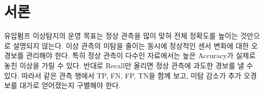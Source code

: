 \documentclass{article}
\begin{document}
\makeatletter\gdef{}\makeatother
{}
\begin{abstract}
기존 PCA 검출기의 경보를 보존하면서 예측잔차 보조 경보를 추가하면, 관측된 오경보 증가를 억제하면서 미탐을 줄일 수 있는가? 본 연구는 정상 자료로 적합한 고정 PCA와 두 과거 관측을 입력으로 사용하는 ridge 예측기를 결합하고, 현재와 직전 잔차 점수가 모두 임계값을 초과할 때만 보조 경보를 허용하는 ``PCA + R5 예측잔차 보조 경보(G1)''를 조사한다. 이미 공개된 과거 평가 H의 정상 3,990행·이상 357행에서 미탐은 28행에서 13행으로 감소하고 오경보는 1행으로 유지되었다. F1은 0.957787에서 0.980057, F2는 0.935722에서 0.970107로 변했다. 같은 임계값에서 연속 확인을 없애면 미탐 10행·오경보 4행으로 바뀌어 확인 규칙의 손익이 드러났다. 추가 탐지 15행은 이미 탐지하던 세 관측 구간의 탐지 범위 확대이며 새 사건 발견은 0개다. 재사용 후반 V는 양쪽 오류가 없어 성능 유지에는 부합하지만 미탐 감소 재현은 판단할 수 없다. 모든 고유 관측의 기존 사용, 정상·이상 수집일 차이, 실제 고장 시작과 독립 신규 자료의 부재를 공개한다. 본 결과는 재현 가능한 제한적 사례 분석이며 현장 일반화·통계적 유의성·범용 알고리즘의 신규성을 입증하지 않는다.
\end{abstract}

\section{서론}
유압펌프 이상탐지의 운영 목표는 정상 관측을 많이 맞혀 전체 정확도를 높이는 것만으로 설명되지 않는다. 이상 관측의 미탐을 줄이는 동시에 정상적인 센서 변화에 대한 오경보를 관리해야 한다. 특히 정상 관측이 다수인 자료에서는 높은 Accuracy가 실제로 놓친 이상을 가릴 수 있다. 반대로 Recall만 올리면 정상 관측에 과도한 경보를 낼 수 있다. 따라서 같은 관측 행에서 TP, FN, FP, TN을 함께 보고, 미탐 감소가 추가 오경보를 대가로 얻어졌는지 구별해야 한다.
\end{document}
